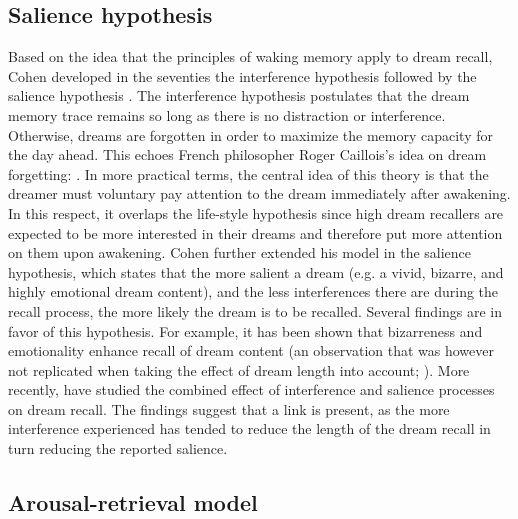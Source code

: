 \subsection{Salience hypothesis}
\label{sec:dream-recall:theories:salience}

Based on the idea that the principles of waking memory apply to dream recall, Cohen developed in the seventies the interference hypothesis \citep{cohen_dream_1973} followed by the salience hypothesis \citep{cohen_test_1974}. The interference hypothesis postulates that the dream memory trace remains so long as there is no distraction or interference. Otherwise, dreams are forgotten in order to maximize the memory capacity for the day ahead. This echoes French philosopher Roger Caillois’s idea on dream forgetting:  \citep{caillois_incertitude_1956}. In more practical terms, the central idea of this theory is that the dreamer must voluntary pay attention to the dream immediately after awakening. In this respect, it overlaps the life-style hypothesis since high dream recallers are expected to be more interested in their dreams and therefore put more attention on them upon awakening.
Cohen further extended his model in the salience hypothesis, which states that the more salient a dream (e.g. a vivid, bizarre, and highly emotional dream content), and the less interferences there are during the recall process, the more likely the dream is to be recalled. Several findings are in favor of this hypothesis. For example, it has been shown that bizarreness \citep{cipolli_bizarreness_1993} and emotionality \citep{schredl_emotions_1998} enhance recall of dream content (an observation that was however not replicated when taking the effect of dream length into account; \citealp{schredl_relationship_2000}). More recently, \citet{parke_re-examination_2009} have studied the combined effect of interference and salience processes on dream recall. The findings suggest that a link is present, as the more interference experienced has tended to reduce the length of the dream recall in turn reducing the reported salience.

\subsection{Arousal-retrieval model}
\label{sec:dream-recall:theories:arousal}

